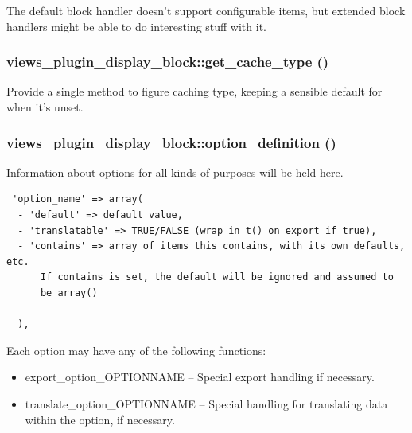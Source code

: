 The default block handler doesn't support configurable items, but extended block handlers might be able to do interesting stuff with it. \hypertarget{classviews__plugin__display__block_4be2fbe3e5f223215268bdd13cdd0312}{
\subsubsection[{get\_\-cache\_\-type}]{\setlength{\rightskip}{0pt plus 5cm}views\_\-plugin\_\-display\_\-block::get\_\-cache\_\-type ()}}
\label{classviews__plugin__display__block_4be2fbe3e5f223215268bdd13cdd0312}


Provide a single method to figure caching type, keeping a sensible default for when it's unset. \hypertarget{classviews__plugin__display__block_aa7cd040bd224b13bb6cada38451b26b}{
\subsubsection[{option\_\-definition}]{\setlength{\rightskip}{0pt plus 5cm}views\_\-plugin\_\-display\_\-block::option\_\-definition ()}}
\label{classviews__plugin__display__block_aa7cd040bd224b13bb6cada38451b26b}


Information about options for all kinds of purposes will be held here. 

\begin{Code}\begin{verbatim} 'option_name' => array(
  - 'default' => default value,
  - 'translatable' => TRUE/FALSE (wrap in t() on export if true),
  - 'contains' => array of items this contains, with its own defaults, etc.
      If contains is set, the default will be ignored and assumed to
      be array()

  ),
\end{verbatim}
\end{Code}

 Each option may have any of the following functions:\begin{itemize}
\item export\_\-option\_\-OPTIONNAME -- Special export handling if necessary.\item translate\_\-option\_\-OPTIONNAME -- Special handling for translating data within the option, if necessary. \end{itemize}


